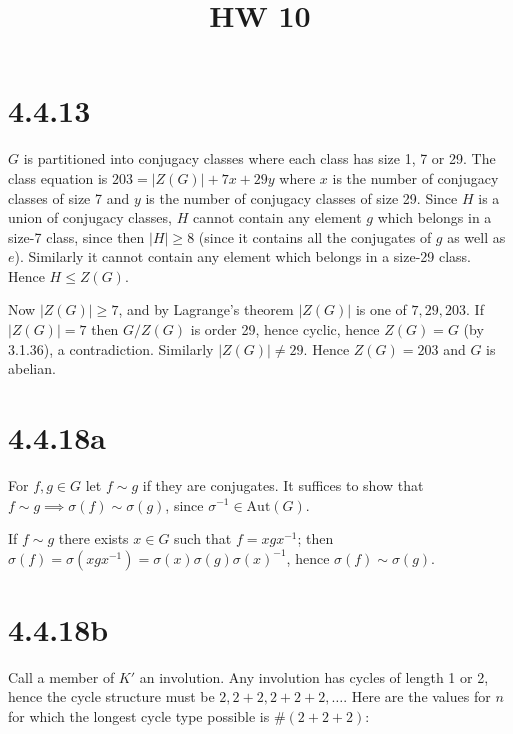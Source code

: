 \documentclass{article}
\title{HW 10}
\date{}
\def\inv{{-1}}
\def\Aut{\textrm{Aut}}
\begin{document}
\maketitle





\section*{4.4.13}

$G$ is partitioned into conjugacy classes where each class has size 1, 7 or 29. The class equation is $203 = |Z(G)| + 7x + 29y$ where $x$ is the number of conjugacy classes of size 7 and $y$ is the number of conjugacy classes of size 29. Since $H$ is a union of conjugacy classes, $H$ cannot contain any element $g$ which belongs in a size-7 class, since then $|H| \ge 8$ (since it contains all the conjugates of $g$ as well as $e$). Similarly it cannot contain any element which belongs in a size-29 class. Hence $H \le Z(G)$.

Now $|Z(G)| \ge 7$, and by Lagrange's theorem $|Z(G)|$ is one of $7, 29, 203$. If $|Z(G)| = 7$ then $G / Z(G)$ is order 29, hence cyclic, hence $Z(G) = G$ (by 3.1.36), a contradiction. Similarly $|Z(G)| \ne 29$. Hence $Z(G) = 203$ and $G$ is abelian.

\section*{4.4.18a}

For $f, g \in G$ let $f \sim g$ if they are conjugates. It suffices to show that $f \sim g \implies \sigma(f) \sim \sigma(g)$, since $\sigma^\inv \in \Aut(G)$.

If $f \sim g$ there exists $x \in G$ such that $f = xgx^\inv$; then $\sigma(f) = \sigma(xgx^\inv) = \sigma(x)\sigma(g)\sigma(x)^\inv$, hence $\sigma(f) \sim \sigma(g)$.

\section*{4.4.18b}

Call a member of $K'$ an involution. Any involution has cycles of length 1 or 2, hence the cycle structure must be $2, 2+2, 2+2+2, \ldots$. Here are the values for $n$ for which the longest cycle type possible is $\#(2+2+2)$:
\end{document}
